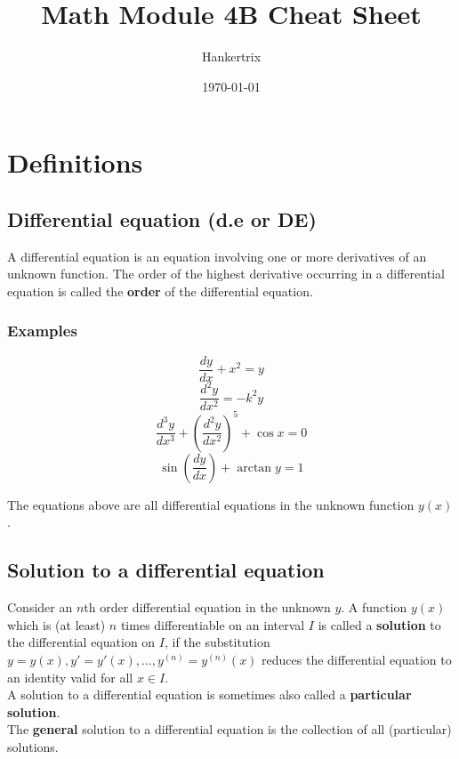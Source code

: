 \documentclass[11pt]{article}
\author{Hankertrix}
\date{\today}
\title{Math Module 4B Cheat Sheet}
\begin{document}
\maketitle
\setcounter{tocdepth}{2}
\tableofcontents

\newpage

\section{Definitions}
\label{sec:org70bcecd}

\subsection{Differential equation (d.e or DE)}
\label{sec:orge35b2c5}
A differential equation is an equation involving one or more derivatives of an unknown function. The order of the highest derivative occurring in a differential equation is called the \textbf{order} of the differential equation.

\subsubsection{Examples}
\label{sec:org4225674}
\[\frac{dy}{dx} + x^2 = y\]
\[\frac{d^2y}{dx^2} = -k^2 y\]
\[\frac{d^3y}{dx^3} + \left( \frac{d^2y}{dx^2} \right)^5 + \cos x = 0\]
\[\sin \left( \frac{dy}{dx} \right) + \arctan y = 1\]

The equations above are all differential equations in the unknown function \(y(x)\).

\subsection{Solution to a differential equation}
\label{sec:org60bea96}
Consider an \(n\)th order differential equation in the unknown \(y\). A function \(y(x)\) which is (at least) \(n\) times differentiable on an interval \(I\) is called a \textbf{solution} to the differential equation on \(I\), if the substitution \(y = y(x), y' = y'(x), \ldots, y^{(n)} = y^{(n)}(x)\) reduces the differential equation to an identity valid for all \(x \in I\).
\\[0pt]

A solution to a differential equation is sometimes also called a \textbf{particular solution}.
\\[0pt]

The \textbf{general} solution to a differential equation is the collection of all (particular) solutions.
\end{document}
